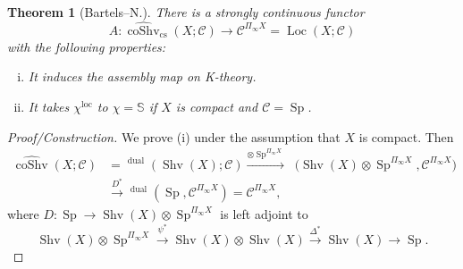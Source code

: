 \documentclass[draft]{amsart}
\renewcommand{\SS}{\mathbb{S}}
\newcommand{\ul}[1]{\underline{#1}}
\newcommand{\wh}[1]{\widehat{#1}}
\newcommand{\cat}[1]{\mathcal{#1}}
\DeclareMathOperator{\coShv}{coShv}
\DeclareMathOperator{\Shv}{Shv}
\DeclareMathOperator{\Sp}{Sp}
\DeclareMathOperator{\iHom}{\ul{Hom}}
\DeclareMathOperator{\Loc}{Loc}
\newtheorem{thm}{Theorem}[section]
\theoremstyle{definition}
\begin{document}
\begin{thm}[Bartels--N.]
There is a strongly continuous functor 
\[
A\colon \wh{\coShv}_{\mathrm{cs}}(X;\cat C) \to \cat C^{\Pi_\infty X} = \Loc(X;\cat C)
\]
with the following properties:
\begin{enumerate}[(i)]
\item It induces the assembly map on K-theory.
\item It takes $\chi^{\mathrm{loc}}$ to $\chi = \SS$ if $X$ is compact and $\cat C = \Sp$.
\end{enumerate}
\end{thm}
\begin{proof}[Proof/Construction]
We prove (i) under the assumption that $X$ is compact. Then
\begin{align*}
\wh{\coShv}(X;\cat C) &= \iHom^{\mathrm{dual}}(\Shv(X);\cat C) \xrightarrow{\otimes \Sp^{\Pi_\infty X}} \iHom\bigl(\Shv(X)\otimes \Sp^{\Pi_\infty X}, \cat C^{\Pi_\infty X}\bigr) \\
&\xrightarrow{D^*} \iHom^{\mathrm{dual}}(\Sp, \cat C^{\Pi_\infty X}) = \cat C^{\Pi_\infty X},
\end{align*}
where $D\colon \Sp \to \Shv(X)\otimes \Sp^{\Pi_\infty X}$ is left adjoint to
\[
\Shv(X)\otimes \Sp^{\Pi_\infty X} \xrightarrow{\psi^*} \Shv(X) \otimes \Shv(X)\xrightarrow{\Delta^*} \Shv(X) \to \Sp.
\]
\end{proof}
\end{document}
